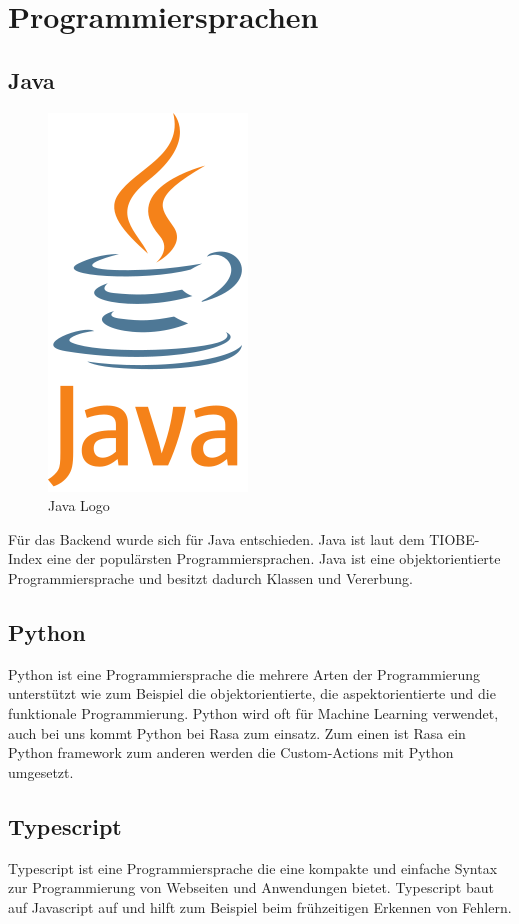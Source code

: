 \section{Programmiersprachen}

\subsection{Java}

\begin{figure}[hbt!]
    \centering
    \includegraphics[scale=0.5]{pics/java}
    \caption{Java Logo\cite{java}}
    \label{fig:impl:java}
\end{figure}

Für das Backend wurde sich für Java entschieden.
Java ist laut dem TIOBE-Index\cite{tiobe} eine der populärsten Programmiersprachen.
Java ist eine objektorientierte Programmiersprache und besitzt dadurch Klassen und Vererbung\cite{java}.

\subsection{Python}
Python ist eine Programmiersprache die mehrere Arten der Programmierung unterstützt wie zum Beispiel die objektorientierte, die aspektorientierte und die funktionale Programmierung.
Python wird oft für Machine Learning verwendet, auch bei uns kommt Python bei Rasa zum einsatz.
Zum einen ist Rasa ein Python framework zum anderen werden die Custom-Actions mit Python umgesetzt.

\subsection{Typescript}
Typescript ist eine Programmiersprache die eine kompakte und einfache Syntax zur Programmierung von Webseiten und Anwendungen bietet.
Typescript baut auf Javascript auf und hilft zum Beispiel beim frühzeitigen Erkennen von Fehlern.

